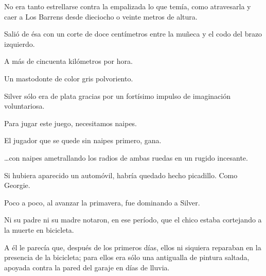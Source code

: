 \sk
No era tanto estrellarse contra la empalizada lo
que temía, como atravesarla y caer a Los Barrens
desde dieciocho o veinte metros de altura.

\sk
Salió de ésa con un corte de doce centímetros entre la
muñeca y el codo del brazo izquierdo.

\sk
A más de cincuenta kilómetros por hora.

\sk
Un mastodonte de color gris polvoriento.

\sk
Silver sólo era de plata gracias por un fortísimo
impulso de imaginación voluntariosa.

\sk
Para jugar este juego, necesitamos naipes.

\sk
El jugador que se quede sin naipes primero, gana.

\sk
\ldots{}con naipes ametrallando los radios de ambas ruedas
en un rugido incesante.

\sk
Si hubiera aparecido un automóvil, habría quedado hecho picadillo.
Como Georgie.

\sk
Poco a poco, al avanzar la primavera, fue dominando a Silver.

\sk
Ni su padre ni su madre notaron, en ese período, que el chico estaba
cortejando a la muerte en bicicleta.

\sk
A él le parecía que, después de los primeros días, ellos ni
siquiera reparaban en la presencia de la
bicicleta; para ellos era sólo una antigualla de
pintura saltada, apoyada contra la pared del
garaje en días de lluvia.


